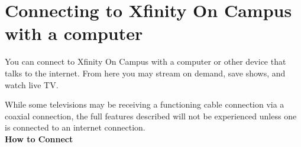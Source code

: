 \documentclass[a4paper, 11pt]{article}
\begin{document}




\section*{
  Connecting to Xfinity On Campus with a computer
}

You can connect to Xfinity On Campus with a computer or other device that
talks to the internet.  From here you may stream on demand, save shows, and 
watch live TV. 

While some televisions may be receiving a functioning cable connection via
a coaxial connection, the full features described will not be 
experienced unless one is connected to an internet connection.\\
{\newline}
\textbf{How to Connect}
\end{document}
